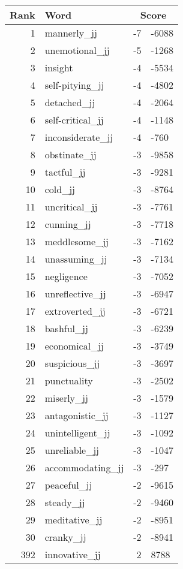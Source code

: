 \begin{longtable}[!htbp]{| rlr@{.}l |}
    \hline
    \textbf{Rank} & \textbf{Word} & \multicolumn{2}{c|}{\textbf{Score}} \\
    \hline
    \endhead
    1 & mannerly\_jj & -7 & -6088 \\
    2 & unemotional\_jj & -5 & -1268 \\
    3 & insight & -4 & -5534 \\
    4 & self-pitying\_jj & -4 & -4802 \\
    5 & detached\_jj & -4 & -2064 \\
    6 & self-critical\_jj & -4 & -1148 \\
    7 & inconsiderate\_jj & -4 & -760 \\
    8 & obstinate\_jj & -3 & -9858 \\
    9 & tactful\_jj & -3 & -9281 \\
    10 & cold\_jj & -3 & -8764 \\
    11 & uncritical\_jj & -3 & -7761 \\
    12 & cunning\_jj & -3 & -7718 \\
    13 & meddlesome\_jj & -3 & -7162 \\
    14 & unassuming\_jj & -3 & -7134 \\
    15 & negligence & -3 & -7052 \\
    16 & unreflective\_jj & -3 & -6947 \\
    17 & extroverted\_jj & -3 & -6721 \\
    18 & bashful\_jj & -3 & -6239 \\
    19 & economical\_jj & -3 & -3749 \\
    20 & suspicious\_jj & -3 & -3697 \\
    21 & punctuality & -3 & -2502 \\
    22 & miserly\_jj & -3 & -1579 \\
    23 & antagonistic\_jj & -3 & -1127 \\
    24 & unintelligent\_jj & -3 & -1092 \\
    25 & unreliable\_jj & -3 & -1047 \\
    26 & accommodating\_jj & -3 & -297 \\
    27 & peaceful\_jj & -2 & -9615 \\
    28 & steady\_jj & -2 & -9460 \\
    29 & meditative\_jj & -2 & -8951 \\
    30 & cranky\_jj & -2 & -8941 \\
    392 & innovative\_jj & 2 & 8788 \\

\end{longtable}
